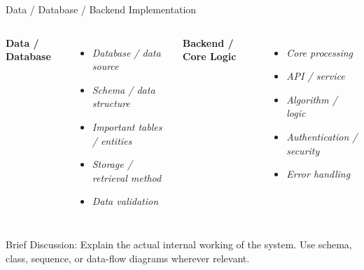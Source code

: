\documentclass[aspectratio=169,11pt]{beamer}
\newcommand{\smallnote}[1]{%
\vspace{0.08cm}
{\scriptsize\color{GEUGrey}#1}
}
\newcommand{\placeholder}[1]{%
\textit{\color{GEUGrey}#1}
}
\begin{document}
\begin{frame}{Data / Database / Backend Implementation}

\begin{columns}[T,totalwidth=\textwidth]


\textbf{\color{GEUBlue}Data / Database}

\begin{itemize}\itemsep3pt
    \item \placeholder{Database / data source}
    \item \placeholder{Schema / data structure}
    \item \placeholder{Important tables / entities}
    \item \placeholder{Storage / retrieval method}
    \item \placeholder{Data validation}
\end{itemize}


\textbf{\color{GEUBlue}Backend / Core Logic}

\begin{itemize}\itemsep3pt
    \item \placeholder{Core processing}
    \item \placeholder{API / service}
    \item \placeholder{Algorithm / logic}
    \item \placeholder{Authentication / security}
    \item \placeholder{Error handling}
\end{itemize}

\end{columns}

\vfill

\smallnote{
Brief Discussion: Explain the actual internal working of the system.
Use schema, class, sequence, or data-flow diagrams wherever relevant.
}

\end{frame}
\end{document}
